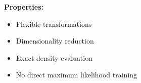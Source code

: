 \documentclass[landscape,a0paper,fontscale=0.292]{baposter}
\newcommand{\cmark}{{\color{green}\ding{51}}}%
\newcommand{\xmark}{{\color{red}\ding{55}}}%
\begin{document}
\begin{poster}
{        %

    \vspace{1em}
    {\bf\color{blue} Properties:}

    \makebox[0.01\textwidth]{} 
    \begin{minipage}[t]{0.44\textwidth}
        \begin{itemize}
            \item[\cmark{}] Flexible transformations
            \item[\cmark{}] Dimensionality reduction
        \end{itemize}
    \end{minipage}%
    \begin{minipage}[t]{0.46\textwidth}
        \begin{itemize}
            \item[\xmark{}] Exact density evaluation
            \item[\xmark{}] No direct maximum likelihood training
        \end{itemize}
    \end{minipage}
}


\end{poster}
\end{document}
